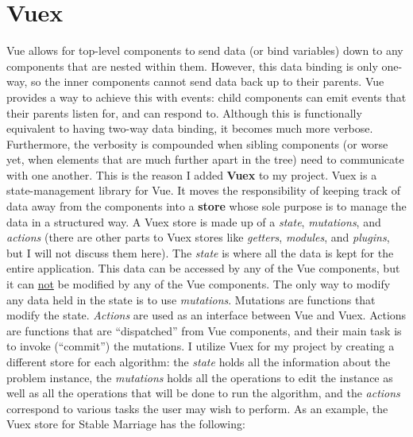 \section{Vuex}
\hspace{-0.26in}
Vue allows for top-level components to send data (or bind variables) down to any components that are 
nested within them. However, this data binding is only one-way, so the inner components
cannot send data back up to their parents. 
Vue provides a way to achieve this with events:
child components can emit events that their parents listen for, and can respond to.
Although this is functionally equivalent to having two-way data binding, it becomes much more verbose. 
Furthermore, the verbosity is compounded when sibling components 
(or worse yet, when elements that are much further apart in the tree)
need to communicate with one another. 
This is the reason I added \textbf{Vuex} \cite{vuex} to my project. 
\newline\newline
Vuex is a state-management library for Vue. It moves the responsibility of keeping track of 
data away from the components into a \textbf{store} whose sole purpose is to manage the data
in a structured way. A Vuex store is made up of a \textit{state}, \textit{mutations}, and \textit{actions} (there are other parts to Vuex stores like \textit{getters}, \textit{modules}, and \textit{plugins}, but I will not discuss them here).
\newline\newline
The \textit{state} is where all the data is kept for the entire application. 
This data can be accessed by any of the Vue components, 
but it can \underline{not} be modified by any of the Vue components. 
The only way to modify any data held in the state is to use \textit{mutations}. 
Mutations are functions that modify the state. 
\textit{Actions} are used as an interface between Vue and Vuex. 
Actions are functions that are ``dispatched'' from Vue components, 
and their main task is to invoke (``commit'') the mutations.
\newline\newline
I utilize Vuex for my project by creating a different store for each algorithm:
the \textit{state} holds all the information about the problem instance, 
the \textit{mutations} holds all the operations to edit the instance 
as well as all the operations that will be done to run the algorithm, 
and the \textit{actions} correspond to various tasks the user may wish to perform.
As an example, the Vuex store for Stable Marriage has the following: 
